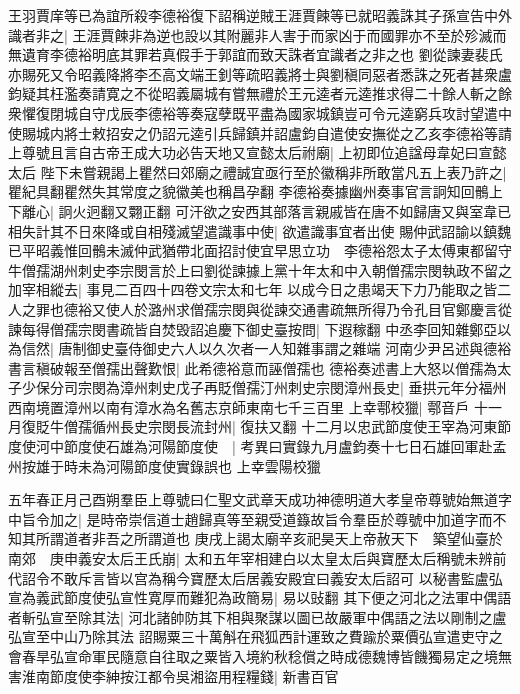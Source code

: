 王羽賈庠等已為誼所殺李德裕復下詔稱逆賊王涯賈餗等已就昭義誅其子孫宣告中外識者非之|{
	王涯賈餗非為逆也設以其附麗非人害于而家凶于而國罪亦不至於殄滅而無遺育李德裕明底其罪若真假手于郭誼而致天誅者宜識者之非之也}
劉從諫妻裴氏亦賜死又令昭義降將李丕高文端王釗等疏昭義將士與劉稹同惡者悉誅之死者甚衆盧鈞疑其枉濫奏請寛之不從昭義屬城有嘗無禮於王元逵者元逵推求得二十餘人斬之餘衆懼復閉城自守戊辰李德裕等奏寇孽既平盡為國家城鎮豈可令元逵窮兵攻討望遣中使賜城内將士敕招安之仍詔元逵引兵歸鎮并詔盧鈞自遣使安撫從之乙亥李德裕等請上尊號且言自古帝王成大功必告天地又宣懿太后祔廟|{
	上初即位追諡母韋妃曰宣懿太后}
陛下未嘗親謁上瞿然曰郊廟之禮誠宜亟行至於徽稱非所敢當凡五上表乃許之|{
	瞿紀具翻瞿然失其常度之貌徽美也稱昌孕翻}
李德裕奏據幽州奏事官言詗知回鶻上下離心|{
	詗火迥翻又翾正翻}
可汗欲之安西其部落言親戚皆在唐不如歸唐又與室韋已相失計其不日來降或自相殘滅望遣識事中使|{
	欲遣識事宜者出使}
賜仲武詔諭以鎮魏已平昭義惟回鶻未滅仲武猶帶北面招討使宜早思立功　李德裕怨太子太傅東都留守牛僧孺湖州刺史李宗閔言於上曰劉從諫據上黨十年太和中入朝僧孺宗閔執政不留之加宰相縱去|{
	事見二百四十四卷文宗太和七年}
以成今日之患竭天下力乃能取之皆二人之罪也德裕又使人於潞州求僧孺宗閔與從諫交通書疏無所得乃令孔目官鄭慶言從諫每得僧孺宗閔書疏皆自焚毁詔追慶下御史臺按問|{
	下遐稼翻}
中丞李回知雜鄭亞以為信然|{
	唐制御史臺侍御史六人以久次者一人知雜事謂之雜端}
河南少尹呂述與德裕書言稹破報至僧孺出聲歎恨|{
	此希德裕意而誣僧孺也}
德裕奏述書上大怒以僧孺為太子少保分司宗閔為漳州刺史戊子再貶僧孺汀州刺史宗閔漳州長史|{
	垂拱元年分福州西南境置漳州以南有漳水為名舊志京師東南七千三百里}
上幸鄠校獵|{
	鄠音戶}
十一月復貶牛僧孺循州長史宗閔長流封州|{
	復扶又翻}
十二月以忠武節度使王宰為河東節度使河中節度使石雄為河陽節度使　|{
	考異曰實錄九月盧鈞奏十七日石雄回軍赴孟州按雄于時未為河陽節度使實錄誤也}
上幸雲陽校獵

五年春正月己酉朔羣臣上尊號曰仁聖文武章天成功神德明道大孝皇帝尊號始無道字中旨令加之|{
	是時帝崇信道士趙歸真等至親受道籙故旨令羣臣於尊號中加道字而不知其所謂道者非吾之所謂道也}
庚戌上謁太廟辛亥祀昊天上帝赦天下　築望仙臺於南郊　庚申義安太后王氏崩|{
	太和五年宰相建白以太皇太后與寶歷太后稱號未辨前代詔令不敢斥言皆以宫為稱今寶歷太后居義安殿宜曰義安太后詔可}
以秘書監盧弘宣為義武節度使弘宣性寛厚而難犯為政簡易|{
	易以䜴翻}
其下便之河北之法軍中偶語者斬弘宣至除其法|{
	河北諸帥防其下相與聚謀以圖已故嚴軍中偶語之法以剛制之盧弘宣至中山乃除其法}
詔賜粟三十萬斛在飛狐西計運致之費踰於粟價弘宣遣吏守之會春旱弘宣命軍民隨意自往取之粟皆入境約秋稔償之時成德魏博皆饑獨易定之境無害淮南節度使李紳按江都令吳湘盜用程糧錢|{
	新書百官}


